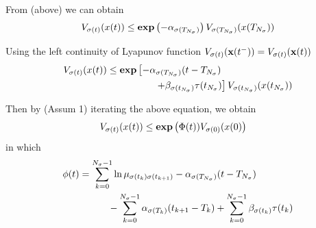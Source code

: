 \documentclass[twocolumn]{autart}    %
\begin{document}
\begin{pf}

    From (above) we can obtain
    \begin{equation}
        \begin{aligned}
            \setlength{\arraycolsep}{0.9pt}
            V_{\sigma(t)}(x(t)) &\leq \bold{exp} \left( -\alpha_{\sigma(T_{N_{\sigma}})} \right) V_{\sigma(T_{N_{\sigma}})}(x(T_{N_{\sigma}}))\\
        \end{aligned}
    \end{equation}

    Using the left continuity of Lyapunov function $V_{\sigma(t)}(\bold{x}(t^{-})) = V_{\sigma(t)}(\bold{x}(t))$
    \begin{equation}
        \begin{aligned}
            \setlength{\arraycolsep}{0.9pt}
            V_{\sigma(t)}(x(t)) &\leq \bold{exp} \left[ -\alpha_{\sigma(T_{N_{\sigma}})}(t-T_{N_{\sigma}})\right.\\
            & \left. \quad \quad \quad \quad \quad+\beta_{\sigma(t_{N_{\sigma}})}\tau(t_{N_{\sigma}})\right]V_{\sigma(t_{N_{\sigma}})}(x(t_{N_{\sigma}}))
        \end{aligned}
    \end{equation}


    Then by (Assum 1) iterating the above equation, we obtain
    \begin{equation}
        \begin{aligned}
            \setlength{\arraycolsep}{0.9pt}
            V_{\sigma(t)}(x(t)) &\leq \bold{exp}\left(\Phi(t))V_{\sigma(0)}(x(0)\right)
        \end{aligned}
    \end{equation}
    in which
    \begin{equation}
        \begin{aligned}
            \setlength{\arraycolsep}{0.9pt}
            \phi(t) &= \sum_{k=0}^{N_{\sigma}-1}\ln\mu_{\sigma(t_{k})\sigma(t_{k+1})} - \alpha_{\sigma(T_{N_{\sigma}})}(t-T_{N_{\sigma}}) \\
            & \quad \quad \quad - \sum_{k=0}^{N_{\sigma}-1}\alpha_{\sigma(T_{k})}(t_{k+1}-T_{k}) + \sum_{k=0}^{N_{\sigma}-1}\beta_{\sigma(t_{k})}\tau(t_{k})
        \end{aligned}
    \end{equation}
    

\end{pf}
\end{document}
